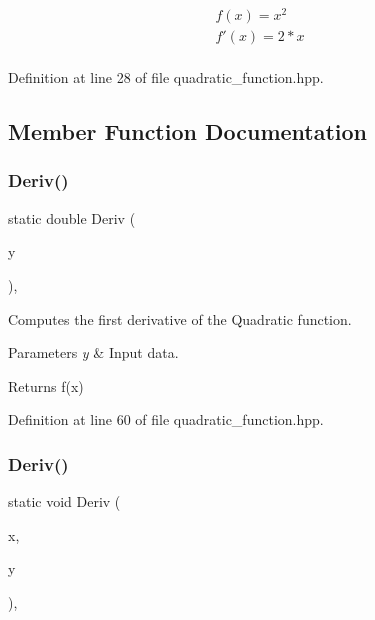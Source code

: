 \begin{eqnarray*} f(x) = x^2 \\ f'(x) = 2 * x \\ \end{eqnarray*} 

Definition at line 28 of file quadratic\+\_\+function.\+hpp.



\subsection{Member Function Documentation}
\mbox{\label{classmlpack_1_1ann_1_1QuadraticFunction_a163d34fd09f8edf457164f5033c635cf}} 
\subsubsection{Deriv()\hspace{0.1cm}{\footnotesize\ttfamily [1/2]}}
{\footnotesize\ttfamily static double Deriv (\begin{DoxyParamCaption}\item[{const double}]{y }\end{DoxyParamCaption})\hspace{0.3cm}{\ttfamily [inline]}, {\ttfamily [static]}}



Computes the first derivative of the Quadratic function. 


\begin{DoxyParams}{Parameters}
{\em y} & Input data. \\
\hline
\end{DoxyParams}
\begin{DoxyReturn}{Returns}
f\textquotesingle{}(x) 
\end{DoxyReturn}


Definition at line 60 of file quadratic\+\_\+function.\+hpp.

\mbox{\label{classmlpack_1_1ann_1_1QuadraticFunction_a0ad035ec996acd7025807d0e9e082887}} 
\subsubsection{Deriv()\hspace{0.1cm}{\footnotesize\ttfamily [2/2]}}
{\footnotesize\ttfamily static void Deriv (\begin{DoxyParamCaption}\item[{const Input\+Vec\+Type \&}]{x,  }\item[{Output\+Vec\+Type \&}]{y }\end{DoxyParamCaption})\hspace{0.3cm}{\ttfamily [inline]}, {\ttfamily [static]}}



